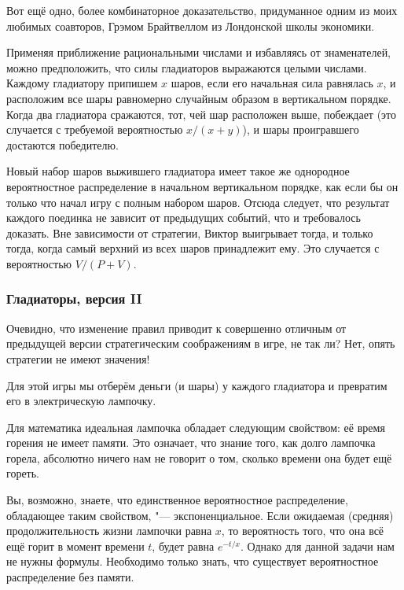 \documentclass[twoside]{book}
\begin{document}
Вот ещё одно, более комбинаторное доказательство, придуманное одним из моих любимых соавторов, Грэмом Брайтвеллом из Лондонской школы экономики. %

Применяя приближение рациональными числами и избавляясь от знаменателей, можно предположить, что силы гладиаторов выражаются целыми числами.
Каждому гладиатору припишем $x$ шаров, если его начальная сила равнялась $x$, и расположим все шары равномерно случайным образом в вертикальном порядке.
Когда два гладиатора сражаются, тот, чей шар расположен выше, побеждает (это случается с требуемой вероятностью $x/(x+y)$), и шары проигравшего достаются победителю.

Новый набор шаров выжившего гладиатора имеет такое же однородное вероятностное распределение в начальном вертикальном порядке, как если бы он только что начал игру с полным набором шаров.
Отсюда следует, что результат каждого поединка не зависит от предыдущих событий, что и требовалось доказать.
Вне зависимости от стратегии, Виктор выигрывает тогда, и только тогда, когда самый верхний из всех шаров принадлежит ему.
Это случается с вероятностью $V/(P+V)$.

\subsubsection*{Гладиаторы, версия II}%

Очевидно, что изменение правил приводит к совершенно отличным от предыдущей версии стратегическим соображениям в игре, не так ли? Нет, опять стратегии не имеют значения!


Для этой игры мы отберём деньги (и шары) у каждого гладиатора и превратим его
в электрическую лампочку.

Для математика идеальная лампочка обладает следующим свойством: её время горения не имеет памяти.
Это означает, что знание того, как долго лампочка горела, абсолютно ничего нам не говорит о том, сколько времени она будет ещё гореть.

Вы, возможно, знаете, что единственное вероятностное распределение, обладающее таким свойством, "--- экспоненциальное.
Если ожидаемая (средняя) продолжительность жизни лампочки равна $x$, то вероятность того, что она всё ещё горит в момент времени $t$, будет равна $e^{-t/x}$.
Однако для данной задачи нам не нужны формулы.
Необходимо только знать, что существует вероятностное распределение без памяти.
\end{document}
